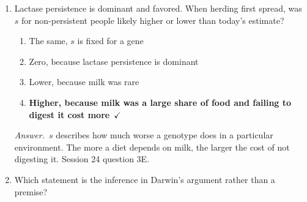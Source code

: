 \documentclass[11pt]{article}
\newcommand{\keyans}[1]{\par\medskip\noindent\textit{Answer.}\ #1\par\medskip}
\begin{document}
\begin{enumerate}[label=\textbf{\arabic*.}, leftmargin=2em, itemsep=1.4em]
\nopagebreak\par{}
\par\smallskip\noindent\begin{tabularx}{\linewidth}{@{}YY@{}}
0.10, \(\Delta\)32 & 0.84, the relative fitness \\[3pt]
0.16, \(s\) & \textbf{0.90, the wild type}\ \(\checkmark\) \\
\end{tabularx}
\keyans{The wild type is selected against, and one WT copy is enough to be susceptible, so WT is the dominant selected-against allele. \(q\) = freq(WT) = 0.90.}
\item Lactase persistence is dominant and favored. When herding first spread, was \(s\) for non-persistent people likely higher or lower than today's estimate?
\nopagebreak\par{}
\par\smallskip
\begin{enumerate}[label={}, leftmargin=2.4em, labelwidth=0pt, itemsep=2pt, topsep=0pt]
\item \hspace*{-2.4em}The same, \(s\) is fixed for a gene
\item \hspace*{-2.4em}Zero, because lactase persistence is dominant
\item \hspace*{-2.4em}Lower, because milk was rare
\item \hspace*{-2.4em}\textbf{Higher, because milk was a large share of food and failing to digest it cost more}\ \(\checkmark\)
\end{enumerate}
\keyans{\(s\) describes how much worse a genotype does in a particular environment. The more a diet depends on milk, the larger the cost of not digesting it. Session 24 question 3E.}
\item Which statement is the inference in Darwin's argument rather than a premise?
\nopagebreak\par{}
\par\smallskip
\begin{enumerate}[label={}, leftmargin=2.4em, labelwidth=0pt, itemsep=2pt, topsep=0pt]

\end{enumerate}
\end{enumerate}
\end{document}
